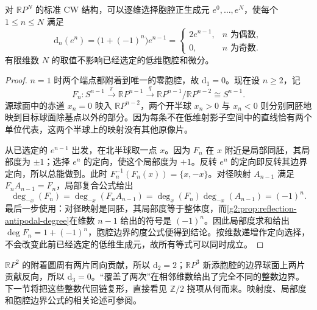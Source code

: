 \begin{proposition}\label{g2:prop:rp-cellular-boundary}
	对 \(\mathbb RP^N\) 的标准 CW 结构，可以逐维选择胞腔正生成元 \(e^0,\ldots,e^N\)，使每个 \(1\le n\le N\) 满足
	\begin{equation}\label{g2:eq:rp-cellular-boundary}
		\mathrm{d}_n(e^n)=\bigl(1+(-1)^n\bigr)e^{n-1}
		=\begin{cases}2e^{n-1},&n\text{ 为偶数},\\0,&n\text{ 为奇数}.\end{cases}
	\end{equation}
	有限维数 \(N\) 的取值不影响已经选定的低维胞腔和微分。
\end{proposition}
\begin{proof}
	\(n=1\) 时两个端点都附着到唯一的零胞腔，故 \(\mathrm{d}_1=0\)。现在设 \(n\ge2\)，记
	\[
		F_n:S^{n-1}\xrightarrow{\pi}\mathbb RP^{n-1}
		\xrightarrow{q}\mathbb RP^{n-1}/\mathbb RP^{n-2}\cong S^{n-1}.
	\]
	源球面中的赤道 \(x_n=0\) 映入 \(\mathbb RP^{n-2}\)，两个开半球 \(x_n>0\) 与 \(x_n<0\) 则分别同胚地映到目标球面除基点以外的部分。因为每条不在低维射影子空间中的直线恰有两个单位代表，这两个半球上的映射没有其他原像片。

	从已选定的 \(e^{n-1}\) 出发，在北半球取一点 \(x\)。因为 \(F_n\) 在 \(x\) 附近是局部同胚，其局部度为 \(\pm1\)；选择 \(e^n\) 的定向，使这个局部度为 \(+1\)。反转 \(e^n\) 的定向即反转其边界定向，所以总能做到。此时 \(F_n^{-1}(F_n(x))=\{x,-x\}\)。对径映射 \(A_{n-1}\) 满足 \(F_nA_{n-1}=F_n\)，局部复合公式给出
	\[
		\deg_{-x}(F_n)
		=\deg_{-x}(F_nA_{n-1})
		=\deg_x(F_n)\deg_{-x}(A_{n-1})
		=(-1)^n.
	\]
	最后一步使用：对径映射是同胚，其局部度等于整体度，而\cref{g2:prop:reflection-antipodal-degree}在维数 \(n-1\) 给出的符号是 \((-1)^n\)。因此局部度求和给出 \(\deg F_n=1+(-1)^n\)，胞腔边界的度公式便得到结论。按维数递增作定向选择，不会改变此前已经选定的低维生成元，故所有等式可以同时成立。
\end{proof}

\(\mathbb RP^2\) 的附着圆周有两片同向贡献，所以 \(\mathrm{d}_2=2\)；\(\mathbb RP^3\) 新添胞腔的边界球面上两片贡献反向，所以 \(\mathrm{d}_3=0\)。“覆盖了两次”在相邻维数给出了完全不同的整数边界。下一节将把这些整数代回链复形，直接看见 \(\mathbb Z/2\) 挠项从何而来。映射度、局部度和胞腔边界公式的相关论述可参阅\cite[第2.2节，Degree 与 Cellular Homology]{Hatcher2002}。
